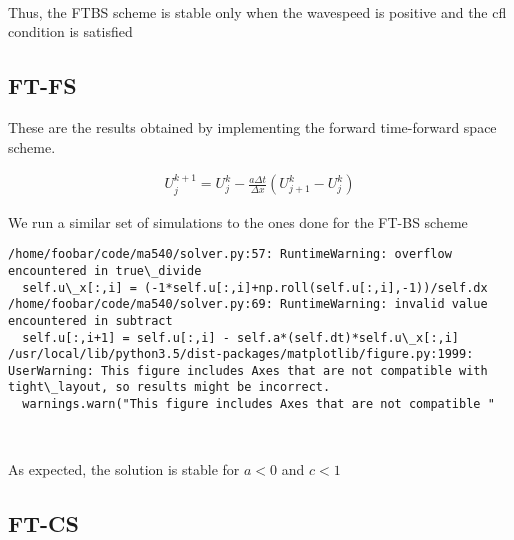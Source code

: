 \documentclass[11pt]{article}
\begin{document}
    \begin{center}
    \end{center}
    { \hspace*{\fill} \\}
    
    Thus, the FTBS scheme is stable only when the wavespeed is positive and
the cfl condition is satisfied

    \subsection{FT-FS}\label{ft-fs}

These are the results obtained by implementing the forward time-forward
space scheme.

\begin{align}
U_j^{k+1} = U_j^k - \frac{a \Delta t}{\Delta x}\left( U_{j+1}^k - U_{j}^k\right)
\end{align}

We run a similar set of simulations to the ones done for the FT-BS
scheme

    \begin{Verbatim}[commandchars=\\\{\}]
/home/foobar/code/ma540/solver.py:57: RuntimeWarning: overflow encountered in true\_divide
  self.u\_x[:,i] = (-1*self.u[:,i]+np.roll(self.u[:,i],-1))/self.dx
/home/foobar/code/ma540/solver.py:69: RuntimeWarning: invalid value encountered in subtract
  self.u[:,i+1] = self.u[:,i] - self.a*(self.dt)*self.u\_x[:,i]
/usr/local/lib/python3.5/dist-packages/matplotlib/figure.py:1999: UserWarning: This figure includes Axes that are not compatible with tight\_layout, so results might be incorrect.
  warnings.warn("This figure includes Axes that are not compatible "

    \end{Verbatim}

    \begin{center}
    \end{center}
    { \hspace*{\fill} \\}
    
    As expected, the solution is stable for \(a<0\) and \(c<1\)

    \subsection{FT-CS}\label{ft-cs}
\end{document}
